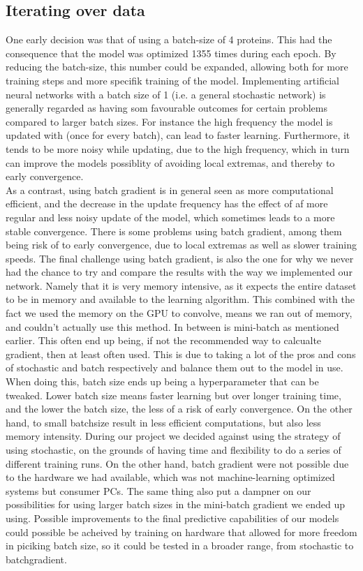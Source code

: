 \subsection{Iterating over data}
 One early decision was that of using a batch-size of 4 proteins. This had the consequence that the model was optimized 1355 times during each epoch. By reducing the batch-size, this number could be expanded, allowing both for more training steps and more specifik training of the model. Implementing artificial neural networks with a batch size of 1 (i.e. a general stochastic network) is generally regarded as having som favourable outcomes for certain problems compared to larger batch sizes. For instance the high frequency the model is updated with (once for every batch), can lead to faster learning. Furthermore, it tends to be more noisy while updating, due to the high frequency, which in turn can improve the models possiblity of avoiding local extremas, and thereby to early convergence.\\ 
  As a contrast, using batch gradient is in general seen as more computational efficient, and the decrease in the update frequency has the effect of af more regular and less noisy update of the model, which sometimes leads to a more stable convergence. There is some problems using batch gradient, among them being risk of to early convergence, due to local extremas as well as slower training speeds. The final challenge using batch gradient, is also the one for why we never had the chance to try and compare the results with the way we implemented our network. Namely that it is very memory intensive, as it expects the entire dataset to be in memory and available to the learning algorithm. This combined with the fact we used the memory on the GPU to convolve, means we ran out of memory, and couldn't actually use this method. In between is mini-batch as mentioned earlier. This often end up being, if not the recommended way to calcualte gradient, then at least often used. This is due to taking a lot of the pros and cons of stochastic and batch respectively and balance them out to the model in use. When doing this, batch size ends up being a hyperparameter that can be tweaked. Lower batch size means faster learning but over longer training time, and the lower the batch size, the less of a risk of early convergence. On the other hand, to small batchsize result in less efficient computations, but also less memory intensity. During our project we decided against using the strategy of using stochastic, on the grounds of having time and flexibility to do a series of different training runs. On the other hand, batch gradient were not possible due to the hardware we had available, which was not machine-learning optimized systems but consumer PCs. The same thing also put a dampner on our possibilities for using larger batch sizes in the mini-batch gradient we ended up using. Possible improvements to the final predictive capabilities of our models could possible be acheived by training on hardware that allowed for more freedom in piciking batch size, so it could be tested in a broader range, from stochastic to batchgradient.\\ 
